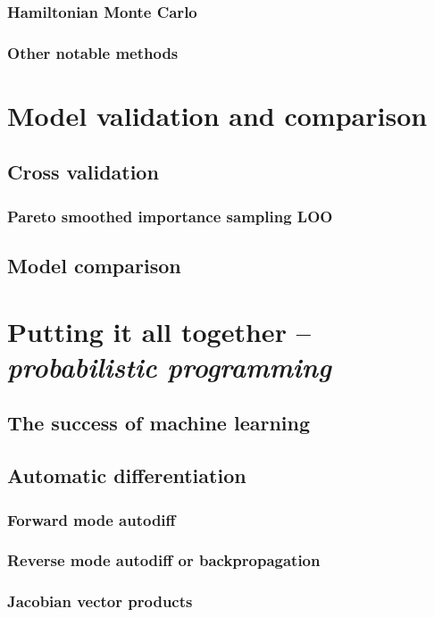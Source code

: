 \documentclass[11pt]{report}
\begin{document}
\subsubsection{Hamiltonian Monte Carlo}
\subsubsection{Other notable methods}

\section{Model validation and comparison}
\label{sec:model_comparison}
\subsection{Cross validation}
\subsubsection{Pareto smoothed importance sampling LOO}
\subsection{Model comparison}

\section{Putting it all together -- \emph{probabilistic programming}}
\label{sec:programming}
\subsection{The success of machine learning}
\subsection{Automatic differentiation}
\subsubsection{Forward mode autodiff}
\subsubsection{Reverse mode autodiff or backpropagation}
\subsubsection{Jacobian vector products}
\end{document}
